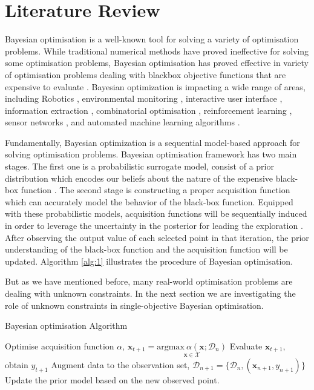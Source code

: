 \chapter{Literature Review}\label{sec:lit}


Bayesian optimisation is a well-known tool for solving a variety of optimisation problems. While traditional numerical methods have proved ineffective for solving some optimisation problems, Bayesian optimisation has proved effective in variety of optimisation problems dealing with blackbox objective functions that are expensive to evaluate \cite{gelbart2014bayesian}. Bayesian optimization is impacting a wide range of areas, including Robotics \cite{lizotte2007automatic,martinez2007active}, environmental monitoring \cite{marchant2012bayesian}, interactive user interface \cite{brochu2010bayesian}, information extraction \cite{wang2014bayesian}, combinatorial optimisation \cite{wang2013bayesian,hutter2011sequential}, reinforcement learning \cite{brochu2010tutorial}, sensor networks \cite{garnett2010bayesian,srinivas2009gaussian}, and automated machine learning algorithms \cite{thornton2013auto,snoek2012practical,hoffman2014correlation,garnett2013active}.
\par
Fundamentally, Bayesian optimization is a sequential model-based approach for solving optimisation problems. Bayesian optimisation framework has two main stages. The first one is a probabilistic surrogate model, consist of a prior distribution which encodes our beliefs about the nature of the expensive black-box function \cite{shahriari2016taking}. The second stage is constructing a proper acquisition function which can accurately model the behavior of the black-box function. Equipped with these probabilistic models, acquisition functions will be sequentially induced  in order to leverage the uncertainty in the posterior for leading the exploration \cite{shahriari2016taking}. After observing the output value of each selected point in that iteration, the prior understanding of the black-box function and the acquisition function will be updated. Algorithm \ref{alg:1} illustrates the procedure of Bayesian optimisation.
\par
But as we have mentioned before, many real-world optimisation problems are dealing with unknown constraints. In the next section we are investigating the role of unknown constraints in single-objective Bayesian optimisation.
\begin{algorithm}
  \caption{Bayesian optimisation Algorithm}\label{algo1}
  \begin{algorithmic}[1]
	  \State Optimise acquisition function $\alpha$,
	  $\textbf{x}_{t+1} = \underset{\textbf{x}   \in \mathcal{X}}{\mathrm{argmax}\ \alpha(\textbf{x};\mathcal{D}_n)}$
	  \State Evaluate $\textbf{x}_{t+1}$, obtain ${y}_{t+1}$
	  \State Augment data to the observation set, $\mathcal{D}_{n+1} = \{\mathcal{D}_n,(\textbf{x}_{n+1},{y}_{n+1})\}$
	  \State Update the prior model based on the new observed point.
	  \EndFor
  \end{algorithmic}
  \label{alg:1}
\end{algorithm}


